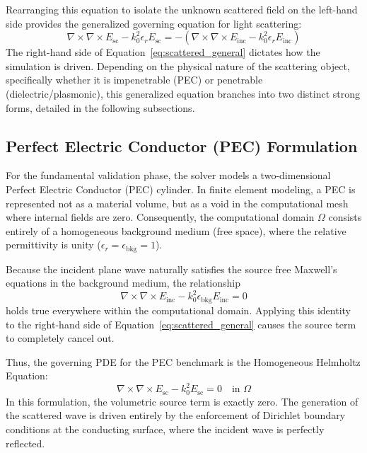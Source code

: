 Rearranging this equation to isolate the unknown scattered field on the left-hand side provides the generalized governing equation for light scattering:
\begin{equation}
\nabla \times \nabla \times E_{\text{sc}} - k_0^2 \epsilon_r E_{\text{sc}} = -\left(\nabla \times \nabla \times E_{\text{inc}} - k_0^2 \epsilon_r E_{\text{inc}}\right)
\label{eq:scattered_general}
\end{equation}
The right-hand side of Equation~\ref{eq:scattered_general} dictates how the simulation is driven. Depending on the physical nature of the scattering object, specifically whether it is impenetrable (PEC) or penetrable (dielectric/plasmonic), this generalized equation branches into two distinct strong forms, detailed in the following subsections.

\subsection{Perfect Electric Conductor (PEC) Formulation}

For the fundamental validation phase, the solver models a two-dimensional Perfect Electric Conductor (PEC) cylinder. In finite element modeling, a PEC is represented not as a material volume, but as a void in the computational mesh where internal fields are zero. Consequently, the computational domain $\Omega$ consists entirely of a homogeneous background medium (free space), where the relative permittivity is unity ($\epsilon_r = \epsilon_{\text{bkg}} = 1$).

\vspace{0.5em}

Because the incident plane wave naturally satisfies the source free Maxwell's equations in the background medium, the relationship
\begin{equation}
\nabla \times \nabla \times E_{\text{inc}} - k_0^2 \epsilon_{\text{bkg}} E_{\text{inc}} = 0
\end{equation}
holds true everywhere within the computational domain. Applying this identity to the right-hand side of Equation~\ref{eq:scattered_general} causes the source term to completely cancel out.

\vspace{0.5em}

Thus, the governing PDE for the PEC benchmark is the Homogeneous Helmholtz Equation:
\begin{equation}
\nabla \times \nabla \times E_{\text{sc}} - k_0^2 E_{\text{sc}} = 0 \quad \text{in } \Omega
\label{eq:pec_helmholtz}
\end{equation}
In this formulation, the volumetric source term is exactly zero. The generation of the scattered wave is driven entirely by the enforcement of Dirichlet boundary conditions at the conducting surface, where the incident wave is perfectly reflected.

